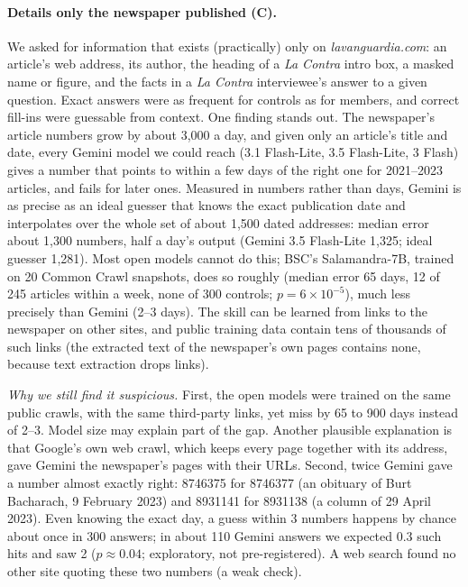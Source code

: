 \documentclass[10pt,a4paper]{article}
\begin{document}
\paragraph{Details only the newspaper published (C).} We asked for information that exists (practically) only on
\emph{lavanguardia.com}: an article's web address, its author, the heading of a \emph{La Contra} intro box, a masked
name or figure, and the facts in a \emph{La Contra} interviewee's answer to a given question. Exact answers were
as frequent for controls as for members, and correct fill-ins were guessable from context. One finding stands out.
The newspaper's article numbers grow by about 3,000 a day, and given only an article's title and date, every Gemini
model we could reach (3.1 Flash-Lite, 3.5 Flash-Lite, 3 Flash) gives a number that points to within a few days of the
right one for 2021--2023 articles, and fails for later ones. Measured in numbers rather than days, Gemini is as precise as an ideal guesser that knows the exact publication
date and interpolates over the whole set of about 1,500 dated addresses: median error about 1,300 numbers, half a
day's output (Gemini 3.5 Flash-Lite 1,325; ideal guesser 1,281). Most open models cannot do this; BSC's Salamandra-7B,
trained on 20 Common Crawl snapshots, does so roughly (median error 65 days, 12 of 245 articles within a week, none of
300 controls; $p=6\times10^{-5}$), much less precisely than Gemini (2--3 days). The skill can be learned from links
to the newspaper on other sites, and public training data contain tens of thousands of such links (the extracted text
of the newspaper's own pages contains none, because text extraction drops links).

\emph{Why we still find it suspicious.} First, the open models were trained on the same public crawls, with the same
third-party links, yet miss by 65 to 900 days instead of 2--3. Model size may explain part of the gap. Another
plausible explanation is that Google's own web crawl, which keeps every page together with its address, gave Gemini
the newspaper's pages with their URLs. Second, twice Gemini gave a number almost exactly right: 8746375 for 8746377
(an obituary of Burt Bacharach, 9 February 2023) and 8931141 for 8931138 (a column of 29 April 2023). Even knowing the
exact day, a guess within 3 numbers happens by chance about once in 300 answers; in about 110 Gemini answers we
expected 0.3 such hits and saw 2 ($p\approx0.04$; exploratory, not pre-registered). A web search found no other site
quoting these two numbers (a weak check).
\end{document}
